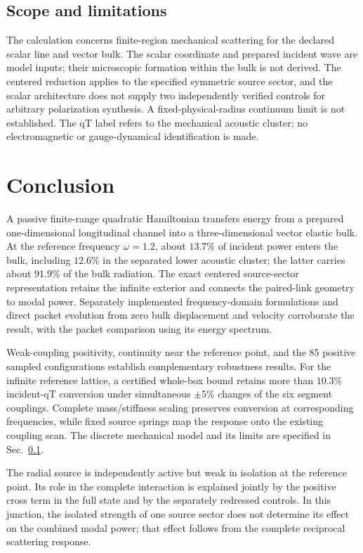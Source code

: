 \documentclass[10pt,aps,pre,reprint,floatfix,notitlepage,nofootinbib]{revtex4-2}
\begin{document}
\subsection{Scope and limitations}
\label{sec:s9-limitations}

The calculation concerns finite-region mechanical scattering for the declared scalar line and vector bulk. The scalar coordinate and prepared incident wave are model inputs; their microscopic formation within the bulk is not derived. The centered reduction applies to the specified symmetric source sector, and the scalar architecture does not supply two independently verified controls for arbitrary polarization synthesis. A fixed-physical-radius continuum limit is not established. The qT label refers to the mechanical acoustic cluster; no electromagnetic or gauge-dynamical identification is made.

\section{Conclusion}
\label{sec:conclusion}

A passive finite-range quadratic Hamiltonian transfers energy from a prepared one-dimensional longitudinal channel into a three-dimensional vector elastic bulk. At the reference frequency $\omega=1.2$, about $13.7\%$ of incident power enters the bulk, including $12.6\%$ in the separated lower acoustic cluster; the latter carries about $91.9\%$ of the bulk radiation. The exact centered source-sector representation retains the infinite exterior and connects the paired-link geometry to modal power. Separately implemented frequency-domain formulations and direct packet evolution from zero bulk displacement and velocity corroborate the result, with the packet comparison using its energy spectrum.

Weak-coupling positivity, continuity near the reference point, and the 85 positive sampled configurations establish complementary robustness results. For the infinite reference lattice, a certified whole-box bound retains more than $10.3\%$ incident-qT conversion under simultaneous $\pm5\%$ changes of the six segment couplings. Complete mass/stiffness scaling preserves conversion at corresponding frequencies, while fixed source springs map the response onto the existing coupling scan. The discrete mechanical model and its limits are specified in Sec.~\ref{sec:s9-limitations}.

The radial source is independently active but weak in isolation at the reference point. Its role in the complete interaction is explained jointly by the positive cross term in the full state and by the separately redressed controls. In this junction, the isolated strength of one source sector does not determine its effect on the combined modal power; that effect follows from the complete reciprocal scattering response.
\end{document}
